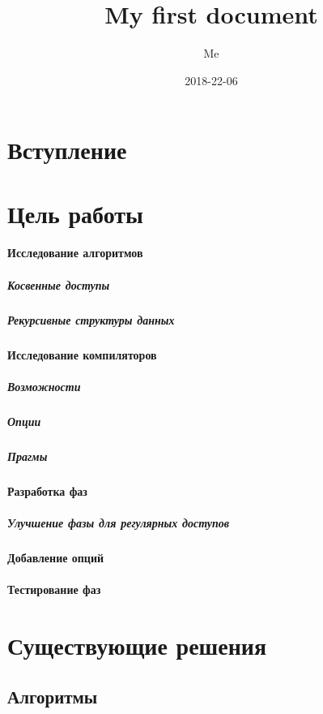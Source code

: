 \documentclass[12pt,a4paper]{article}
\title{My first document}
\date{2018-22-06}
\author{Me}
\begin{document}

\tableofcontents
\newpage


\section{Вступление}

\section{Цель работы}

\paragraph{Исследование алгоритмов}

\subparagraph{Косвенные доступы}

\subparagraph{Рекурсивные структуры данных}

\paragraph{Исследование компиляторов}

\subparagraph{Возможности}

\subparagraph{Опции}

\subparagraph{Прагмы}

\paragraph{Разработка фаз}

\subparagraph{Улучшение фазы для регулярных доступов}

\paragraph{Добавление опций}

\paragraph{Тестирование фаз}

\section{Существующие решения}

\subsection{Алгоритмы}
\end{document}
